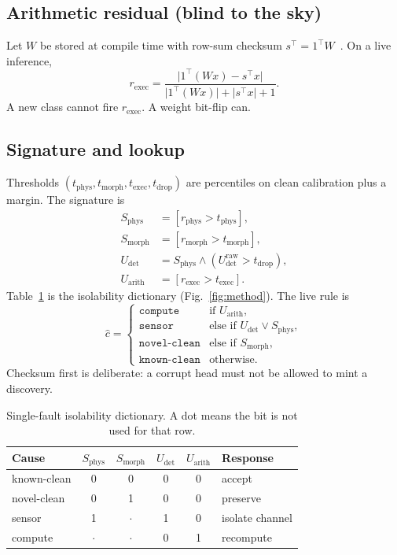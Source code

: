 \documentclass{ieeeaccess}
\begin{document}
\subsection{Arithmetic residual (blind to the sky)}
Let $W$ be stored at compile time with row-sum checksum $s^\top=1^\top W$~\cite{ftcnn2020}. On a live inference,
\[
r_{\mathrm{exec}}=\frac{\lvert 1^\top(Wx)-s^\top x\rvert}{\lvert 1^\top(Wx)\rvert+\lvert s^\top x\rvert+1}.
\]
A new class cannot fire $r_{\mathrm{exec}}$. A weight bit-flip can.

\subsection{Signature and lookup}
Thresholds $(t_{\mathrm{phys}},t_{\mathrm{morph}},t_{\mathrm{exec}},t_{\mathrm{drop}})$ are percentiles on clean calibration plus a margin. The signature is
\begin{align*}
S_{\mathrm{phys}} &= [r_{\mathrm{phys}}>t_{\mathrm{phys}}],\\
S_{\mathrm{morph}} &= [r_{\mathrm{morph}}>t_{\mathrm{morph}}],\\
U_{\mathrm{det}} &= S_{\mathrm{phys}}\wedge(U_{\mathrm{det}}^{\mathrm{raw}}>t_{\mathrm{drop}}),\\
U_{\mathrm{arith}} &= [r_{\mathrm{exec}}>t_{\mathrm{exec}}].
\end{align*}
Table~\ref{tab:dict} is the isolability dictionary (Fig.~\ref{fig:method}). The live rule is
\begin{equation}
\hat{c}=\begin{cases}
\texttt{compute} & \text{if }U_{\mathrm{arith}},\\
\texttt{sensor} & \text{else if }U_{\mathrm{det}}\vee S_{\mathrm{phys}},\\
\texttt{novel-clean} & \text{else if }S_{\mathrm{morph}},\\
\texttt{known-clean} & \text{otherwise.}
\end{cases}
\label{eq:lookup}
\end{equation}
Checksum first is deliberate: a corrupt head must not be allowed to mint a discovery.

\begin{table}[!t]
\caption{Single-fault isolability dictionary. A dot means the bit is not used for that row.}
\label{tab:dict}
\centering
\begin{tabular}{lccccp{}}
\toprule
Cause & $S_{\mathrm{phys}}$ & $S_{\mathrm{morph}}$ & $U_{\mathrm{det}}$ & $U_{\mathrm{arith}}$ & Response \\
\midrule
known-clean & 0 & 0 & 0 & 0 & accept \\
novel-clean & 0 & 1 & 0 & 0 & preserve \\
sensor & 1 & $\cdot$ & 1 & 0 & isolate channel \\
compute & $\cdot$ & $\cdot$ & 0 & 1 & recompute \\
\bottomrule
\end{tabular}
\end{table}
\end{document}
